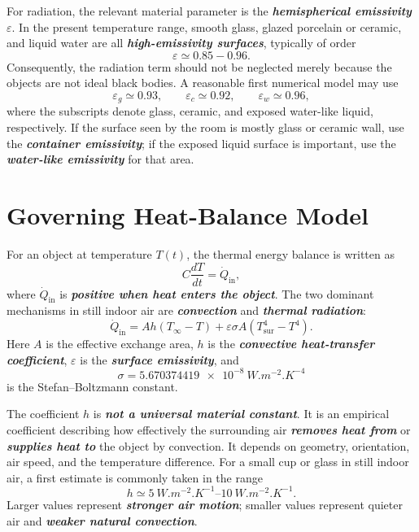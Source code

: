\documentclass[11pt]{article}
\begin{document}
For radiation, the relevant material parameter is the \textbf{\textit{hemispherical emissivity}} $\varepsilon$. In the present temperature range, smooth glass, glazed porcelain or ceramic, and liquid water are all \textbf{\textit{high-emissivity surfaces}}, typically of order
\begin{equation}
    \varepsilon \simeq 0.85-0.96.
\end{equation}
Consequently, the radiation term should not be neglected merely because the objects are not ideal black bodies. A reasonable first numerical model may use
\begin{equation}
    \varepsilon_g \simeq 0.93, \qquad
    \varepsilon_c \simeq 0.92, \qquad
    \varepsilon_w \simeq 0.96,
\end{equation}
where the subscripts denote glass, ceramic, and exposed water-like liquid, respectively. If the surface seen by the room is mostly glass or ceramic wall, use the \textbf{\textit{container emissivity}}; if the exposed liquid surface is important, use the \textbf{\textit{water-like emissivity}} for that area.

\section{Governing Heat-Balance Model}

For an object at temperature $T(t)$, the thermal energy balance is written as
\begin{equation}
    C\frac{dT}{dt}=\dot Q_{\mathrm{in}},
\end{equation}
where $\dot Q_{\mathrm{in}}$ is \textbf{\textit{positive when heat enters the object}}. The two dominant mechanisms in still indoor air are \textbf{\textit{convection}} and \textbf{\textit{thermal radiation}}:
\begin{equation}
    \dot Q_{\mathrm{in}}
    = A h\left(T_{\infty}-T\right)
    + \varepsilon\sigma A\left(T_{\mathrm{sur}}^4-T^4\right).
    \label{eq:balance}
\end{equation}
Here $A$ is the effective exchange area, $h$ is the \textbf{\textit{convective heat-transfer coefficient}}, $\varepsilon$ is the \textbf{\textit{surface emissivity}}, and
\begin{equation}
    \sigma = \SI{5.670374419e-8}{W.m^{-2}.K^{-4}}
\end{equation}
is the Stefan--Boltzmann constant.

The coefficient $h$ is \textbf{\textit{not a universal material constant}}. It is an empirical coefficient describing how effectively the surrounding air \textbf{\textit{removes heat from}} or \textbf{\textit{supplies heat to}} the object by convection. It depends on geometry, orientation, air speed, and the temperature difference. For a small cup or glass in still indoor air, a first estimate is commonly taken in the range
\begin{equation}
    h \simeq \SIrange{5}{10}{W.m^{-2}.K^{-1}}.
\end{equation}
Larger values represent \textbf{\textit{stronger air motion}}; smaller values represent quieter air and \textbf{\textit{weaker natural convection}}.
\end{document}
